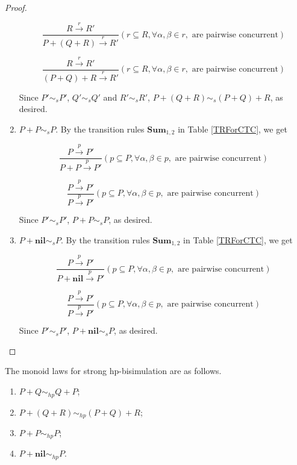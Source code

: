 \begin{proof}
\begin{enumerate}
      $$\frac{R\xrightarrow{r}R'}{P+(Q+R)\xrightarrow{r}R'}(r\subseteq R,\forall\alpha,\beta \in r,\textrm{ are pairwise concurrent})$$

      $$\frac{R\xrightarrow{r}R'}{(P+Q)+R\xrightarrow{r}R'}(r\subseteq R,\forall\alpha,\beta \in r,\textrm{ are pairwise concurrent})$$

      Since $P'\sim_s P'$, $Q'\sim_s Q'$ and $R'\sim_s R'$, $P+(Q+R)\sim_s (P+Q)+R$, as desired.
  \item $P+P\sim_s P$. By the transition rules $\textbf{Sum}_{1,2}$ in Table \ref{TRForCTC}, we get

      $$\frac{P\xrightarrow{p}P'}{P+ P\xrightarrow{p}P'}(p\subseteq P,\forall\alpha,\beta \in p,\textrm{ are pairwise concurrent})$$

      $$\frac{P\xrightarrow{p}P'}{P\xrightarrow{p}P'}(p\subseteq P,\forall\alpha,\beta \in p,\textrm{ are pairwise concurrent})$$

      Since $P'\sim_s P'$, $P+ P\sim_s P$, as desired.
  \item $P+\textbf{nil}\sim_s P$. By the transition rules $\textbf{Sum}_{1,2}$ in Table \ref{TRForCTC}, we get

      $$\frac{P\xrightarrow{p}P'}{P+ \textbf{nil}\xrightarrow{p}P'}(p\subseteq P,\forall\alpha,\beta \in p,\textrm{ are pairwise concurrent})$$

      $$\frac{P\xrightarrow{p}P'}{P\xrightarrow{p}P'}(p\subseteq P,\forall\alpha,\beta \in p,\textrm{ are pairwise concurrent})$$

      Since $P'\sim_s P'$, $P+ \textbf{nil}\sim_s P$, as desired.
\end{enumerate}
\end{proof}

\begin{proposition} The monoid laws for strong hp-bisimulation are as follows.
\begin{enumerate}
  \item $P+Q\sim_{hp} Q+P$;
  \item $P+(Q+R)\sim_{hp} (P+Q)+R$;
  \item $P+P\sim_{hp} P$;
  \item $P+\textbf{nil}\sim_{hp} P$.
\end{enumerate}
\end{proposition}

